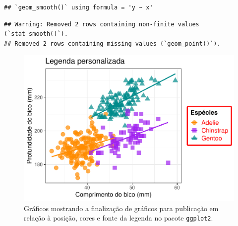 \documentclass[
]{article}
\begin{document}
\begin{verbatim}
## `geom_smooth()` using formula = 'y ~ x'
\end{verbatim}

\begin{verbatim}
## Warning: Removed 2 rows containing non-finite values (`stat_smooth()`).
## Removed 2 rows containing missing values (`geom_point()`).
\end{verbatim}

\begin{figure}
\centering
\includegraphics{epr_files/figure-latex/fig-plot-final-legenda-4.pdf}
\caption{\label{fig:fig-plot-final-legenda-4}Gráficos mostrando a finalização de gráficos para publicação em relação à posição, cores e fonte da legenda no pacote \texttt{ggplot2}.}
\end{figure}
\end{document}

